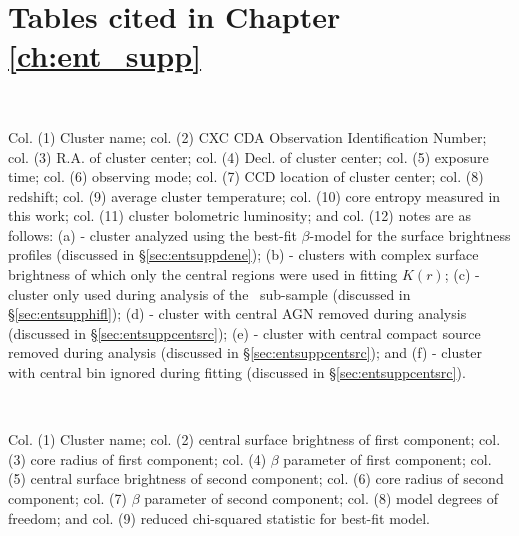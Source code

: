 \chapter{Tables cited in Chapter \ref{ch:ent_supp}}

\begin{center}
\\
\end{center}
Col. (1) Cluster name; col. (2) CXC CDA Observation Identification
Number; col. (3) R.A. of cluster center; col. (4) Decl. of cluster
center; col. (5) exposure time; col. (6) observing mode; col. (7) CCD
location of cluster center; col. (8) redshift; col. (9) average
cluster temperature; col. (10) core entropy measured in this work;
col. (11) cluster bolometric luminosity; and col. (12) notes are as
follows: (a) - cluster analyzed using the best-fit $\beta$-model for
the surface brightness profiles (discussed in
\S\ref{sec:entsuppdene}); (b) - clusters with complex surface brightness of
which only the central regions were used in fitting $K(r)$; (c) -
cluster only used during analysis of the \hifl\ sub-sample (discussed
in \S\ref{sec:entsupphifl}); (d) - cluster with central AGN removed during
analysis (discussed in \S\ref{sec:entsuppcentsrc}); (e) - cluster with
central compact source removed during analysis (discussed in
\S\ref{sec:entsuppcentsrc}); and (f) - cluster with central bin ignored
during fitting (discussed in \S\ref{sec:entsuppcentsrc}).

\begin{center}
\\
\end{center}
Col. (1) Cluster name; col. (2) central surface brightness of first
component; col. (3) core radius of first component; col. (4) $\beta$
parameter of first component; col. (5) central surface brightness of
second component; col. (6) core radius of second component; col. (7)
$\beta$ parameter of second component; col. (8) model degrees of
freedom; and col. (9) reduced chi-squared statistic for best-fit
model.

